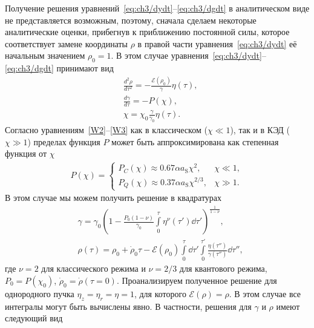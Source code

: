 Получение решения уравнений~\eqref{eq:ch3/dydt}--\eqref{eq:ch3/dgdt} в аналитическом виде не представляется возможным, поэтому, сначала сделаем некоторые аналитические оценки, прибегнув к приближению постоянной силы, которое соответствует замене координаты $\rho$ в правой части уравнения~\eqref{eq:ch3/dydt} её начальным значением $\rho_0 = 1 $.
В этом случае уравнения~\eqref{eq:ch3/dydt}--\eqref{eq:ch3/dgdt} принимают вид
\begin{align}
    &\frac{d^2\rho}{d\tau^2} = -\frac{\mathcal{E} \left( \rho_0 \right)}{\gamma} \eta(\tau) , \\
    \label{eq:ch3/app_g}
    &\frac{d\gamma}{d\tau} = -P \left( \chi \right),   \\
    &\chi = \chi_0 \frac{\gamma}{\gamma_0} \eta(\tau) .
\end{align}
Согласно уравнениям~\eqref{W2}--\eqref{W3} как в классическом ($\chi \ll 1$), так и в КЭД ($\chi \gg 1$) пределах функция $P$ может быть аппроксимирована как степенная функция от $\chi$
\begin{align}
    \label{eq:ch3/I}
    P(\chi) = 
    \begin{cases}
        P_C(\chi) \approx 0.67 \alpha a_\mathrm{S} \chi^2, & \chi \ll 1, \\
        P_Q(\chi) \approx 0.37 \alpha a_\mathrm{S} \chi^{2/3}, & \chi \gg 1.
      \end{cases} 
\end{align}
В этом случае мы можем получить решение в квадратурах
\begin{align}
    \label{eq:ch3/sol1}
    &\gamma = \gamma_0 \left( 1 - \frac{P_0 (1 - \nu)}{\gamma_0} \int \limits_{0}^{\tau}\eta^\nu(\tau')\dd\tau' \right)^{\frac{1}{1-\nu}}  ,\\
    &\rho(\tau) = \rho_0 + \dot{\rho}_0 \tau   - \mathcal{E} \left( \rho_0 \right)  \int\limits_{0}^{\tau} \dd\tau' \int\limits_{0}^{\tau'} \frac{\eta( \tau'' ) }{\gamma(\tau'')} \dd\tau'',
\end{align}
где $\nu = 2$ для классического режима и $\nu = 2/3$ для квантового режима, $P_0 = P \left( \chi_0 \right)$, $\dot{\rho}_0 = \dot {\rho} (\tau = 0 )$.
Проанализируем полученное решение для однородного пучка $\eta_z =\eta_r =\eta = 1$, для которого $\mathcal{E}(\rho) = \rho$.
В этом случае все интегралы могут быть вычислены явно.
В частности, решения для $\gamma$ и $\rho$ имеют следующий вид
